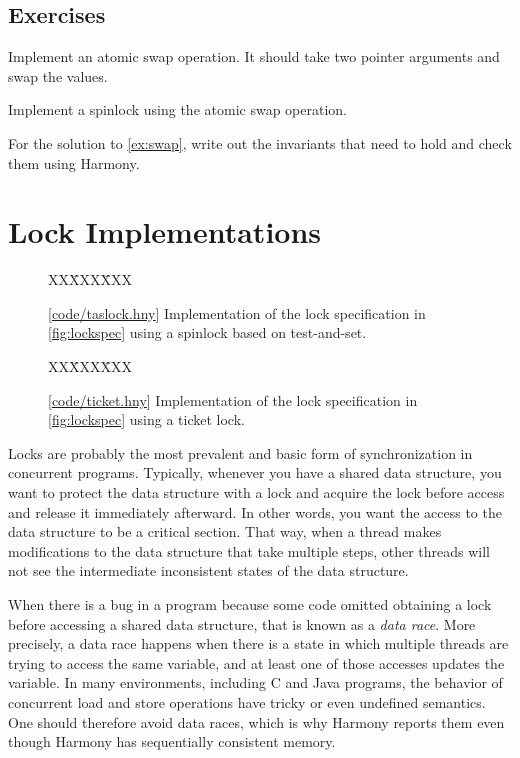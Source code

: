 \documentclass{report}
\newcommand{\harmonysource}[1]{
\begin{tabbing}
XX\=XXX\=XXX\kill
    
\end{tabbing}
}
\newcommand{\harmonylink}[1]{%
[\href{https://harmony.cs.cornell.edu/#1}{\underline{#1}}]%
}
\newenvironment{code}{
\tcolorbox
}{
\endtcolorbox
}
\begin{document}
\section*{Exercises}
\begin{problems}
\item Implement an atomic swap operation.  It should take two pointer arguments
and swap the values.
\item \label{ex:swap} Implement a spinlock using the atomic swap operation.
\item For the solution to \autoref{ex:swap},
write out the invariants that need to hold and check them using Harmony.
\end{problems}

\chapter{Lock Implementations}
\label{ch:synch}
%
%

\begin{figure}
\begin{code}
\harmonysource{taslock}
\end{code}
\caption{\harmonylink{code/taslock.hny} Implementation of the lock
specification in \autoref{fig:lockspec} using a spinlock based on
test-and-set.}
\label{fig:tas2}
\end{figure}

\begin{figure}
\begin{code}
\harmonysource{ticket}
\end{code}
\caption{\harmonylink{code/ticket.hny} Implementation of the lock
specification in \autoref{fig:lockspec} using a ticket lock.}
\label{fig:ticket}
\end{figure}

Locks are probably the most prevalent and basic form of synchronization
in concurrent programs.  Typically, whenever you have a shared data
structure, you want to protect the data structure with a lock and
acquire the lock before access and release it immediately afterward.
In other words, you want the access to the data structure to be a
critical section.
That way, when a thread makes modifications to the data structure that take
multiple steps, other threads will not see the intermediate inconsistent
states of the data structure.

%
%
When there is a bug in a program because some code omitted obtaining
a lock before accessing a shared data structure, that is known as a
\emph{data race}.
More precisely, a data race happens when there is a state in which multiple
threads are trying to access the same variable, and at least one of those
accesses updates the variable.
In many environments, including C and Java programs, the behavior of
concurrent load and store operations have tricky or even undefined
semantics.  One should therefore avoid data races, which is why Harmony
reports them even though Harmony has sequentially consistent memory.
\end{document}
